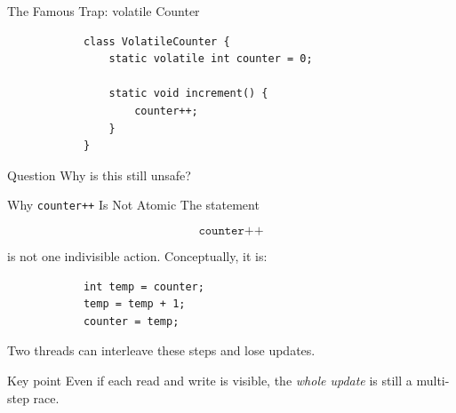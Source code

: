 \documentclass[aspectratio=169,11pt]{beamer}
\begin{document}
	\begin{frame}[fragile]{The Famous Trap: volatile Counter}
		\begin{lstlisting}
			class VolatileCounter {
				static volatile int counter = 0;
				
				static void increment() {
					counter++;
				}
			}
		\end{lstlisting}
		
		\vspace{0.2cm}
		
		\begin{alertblock}{Question}
			Why is this still unsafe?
		\end{alertblock}
	\end{frame}
	
	\begin{frame}[fragile]{Why \texttt{counter++} Is Not Atomic}
		The statement
		
		\[
		\texttt{counter++}
		\]
		
		is not one indivisible action. Conceptually, it is:
		
		\begin{lstlisting}
			int temp = counter;
			temp = temp + 1;
			counter = temp;
		\end{lstlisting}
		
		\vspace{0.3cm}
		
		Two threads can interleave these steps and lose updates.
		
		\vspace{0.3cm}
		
		\begin{exampleblock}{Key point}
			Even if each read and write is visible, the \emph{whole update} is still a multi-step race.
		\end{exampleblock}
	\end{frame}
	
\end{document}
